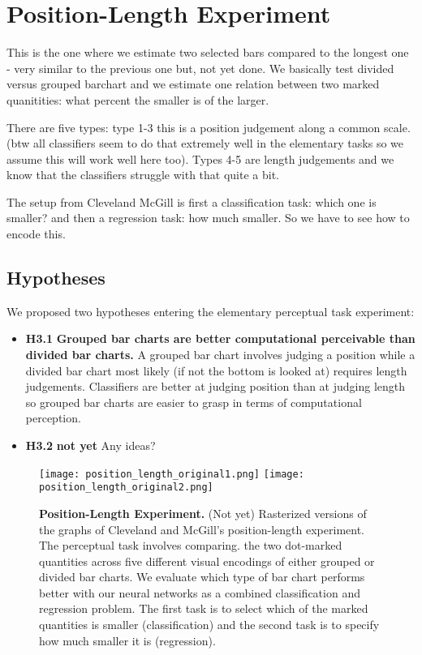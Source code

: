 \section{Position-Length Experiment}

This is the one where we estimate two selected bars compared to the longest one - very similar to the previous one but, not yet done. We basically test divided versus grouped barchart and we estimate one relation between two marked quanitities: what percent the smaller is of the larger.

There are five types: type 1-3 this is a position judgement along a common scale. (btw all classifiers seem to do that extremely well in the elementary tasks so we assume this will work well here too). Types 4-5 are length judgements and we know that the classifiers struggle with that quite a bit.

The setup from Cleveland McGill is first a classification task: which one is smaller? and then a regression task: how much smaller. So we have to see how to encode this.


\subsection{Hypotheses}

We proposed two hypotheses entering the elementary perceptual task experiment:

\begin{itemize}
	\item \textbf{H3.1} \textbf{Grouped bar charts are better computational perceivable than divided bar charts.} A grouped bar chart involves judging a position while a divided bar chart most likely (if not the bottom is looked at) requires length judgements. Classifiers are better at judging position than at judging length so grouped bar charts are easier to grasp in terms of computational perception.
	\item \textbf{H3.2} \textbf{not yet} Any ideas?
\end{itemize}


\begin{figure}[t]
	  \texttt{[image: position\_length\_original1.png]}
	  \texttt{[image: position\_length\_original2.png]}
	  
  \caption{\textbf{Position-Length Experiment.} (Not yet) Rasterized versions of the graphs of Cleveland and McGill's position-length experiment. The perceptual task involves comparing. the two dot-marked quantities across five different visual encodings of either grouped or divided bar charts. We evaluate which type of bar chart performs better with our neural networks as a combined classification and regression problem. The first task is to select which of the marked quantities is smaller (classification) and the second task is to specify how much smaller it is (regression).}
	\label{fig:position_length_experiment}
\end{figure}

